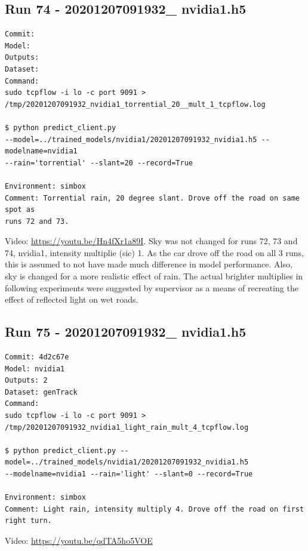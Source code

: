 \subsection{Run 74 - 20201207091932\_ nvidia1.h5}
\label{app_res:74}
\begin{verbatim}
Commit: 
Model: 
Outputs: 
Dataset: 
Command:
sudo tcpflow -i lo -c port 9091 >
/tmp/20201207091932_nvidia1_torrential_20__mult_1_tcpflow.log

$ python predict_client.py
--model=../trained_models/nvidia1/20201207091932_nvidia1.h5 --modelname=nvidia1
--rain='torrential' --slant=20 --record=True

Environment: simbox
Comment: Torrential rain, 20 degree slant. Drove off the road on same spot as
runs 72 and 73.
\end{verbatim}
Video: \url{https://youtu.be/Hn4fXr1a89I}. Sky was not changed for runs 72, 73 and 74, nvidia1, intensity multiplie (sic) 1. As the car drove off the road on all 3 runs, this is assumed to not have made much difference in model performance. Also, sky is changed for a more realistic effect of rain. The actual brighter multiplies in following experiments were suggested by supervisor as a means of recreating the effect of reflected light on wet roads.

\subsection{Run 75 - 20201207091932\_ nvidia1.h5 }
\label{app_res:75}
\begin{verbatim}
Commit: 4d2c67e
Model: nvidia1
Outputs: 2
Dataset: genTrack
Command:
sudo tcpflow -i lo -c port 9091 > /tmp/20201207091932_nvidia1_light_rain_mult_4_tcpflow.log

$ python predict_client.py --model=../trained_models/nvidia1/20201207091932_nvidia1.h5
--modelname=nvidia1 --rain='light' --slant=0 --record=True

Environment: simbox
Comment: Light rain, intensity multiply 4. Drove off the road on first right turn.
\end{verbatim}
Video: \url{https://youtu.be/qdTA5ho5VOE}

